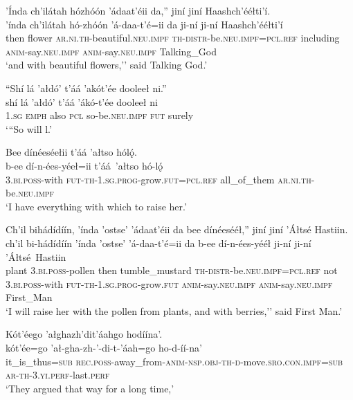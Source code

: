 \ea\label{ex:text5-6-20}
’Índa ch’ilátah hózhóón ’ádaat’éii da,'' jiní jiní Haashch’ééłti’í.\\
\gll ’índa	ch’ilátah	hó-zhóón	’á-daa-t’é=ii	da	ji-ní	ji-ní	Haashch’ééłti’í\\
     then	flower	\textsc{ar}.\textsc{ni}.\textsc{th}-beautiful.\textsc{neu}.\textsc{impf}	\textsc{th}-\textsc{distr}-be.\textsc{neu}.\textsc{impf}=\textsc{pcl}.\textsc{ref}	including	\textsc{anim}-say.\textsc{neu}.\textsc{impf}	\textsc{anim}-say.\textsc{neu}.\textsc{impf}	Talking\_God\\
\glt `and with beautiful flowers,'' said Talking God.'
\z

\ea\label{ex:text5-6-21}
``Shí lá ’ałdó’ t’áá ’akót’ée dooleeł ni.''\\
\gll shí	lá	’ałdó’	t’áá	’ákó-t’ée	dooleeł	ni\\
     1.\textsc{sg}	\textsc{emph}	also	\textsc{pcl}	so-be.\textsc{neu}.\textsc{impf}	\textsc{fut}	surely\\
\glt `{``}So will l.'
\z

\ea\label{ex:text5-6-22}
Bee dínéeséełii t’áá ’ałtso hólǫ́.\\
\gll b-ee	dí-n-ées-yéeł=ii	t’áá~{’ałtso}	hó-lǫ́\\
     3.\textsc{bi}.\textsc{poss}-with	\textsc{fut}-\textsc{th}-1.\textsc{sg}.\textsc{prog}-grow.\textsc{fut}=\textsc{pcl}.\textsc{ref}	all\_of\_them	\textsc{ar}.\textsc{ni}.\textsc{th}-be.\textsc{neu}.\textsc{impf}\\
\glt `I have everything with which to raise her.'
\z

\ea\label{ex:text5-6-23}
Ch’il bihádídíín, ’índa ’ostse’ ’ádaat’éii da bee dínéesééł,'' jiní jiní ’Áłtsé Hastiin.\\
\gll ch’il	bi-hádídíín	’índa	’ostse’	’á-daa-t’é=ii	da	b-ee	dí-n-ées-yééł	ji-ní	ji-ní	’Áłtsé~{Hastiin}\\
     plant	3.\textsc{bi}.\textsc{poss}-pollen	then	tumble\_mustard	\textsc{th}-\textsc{distr}-be.\textsc{neu}.\textsc{impf}=\textsc{pcl}.\textsc{ref}	not	3.\textsc{bi}.\textsc{poss}-with	\textsc{fut}-\textsc{th}-1.\textsc{sg}.\textsc{prog}-grow.\textsc{fut}	\textsc{anim}-say.\textsc{neu}.\textsc{impf}	\textsc{anim}-say.\textsc{neu}.\textsc{impf}	First\_Man\\
\glt `I will raise her with the pollen from plants, and with berries,'' said First Man.'
\z

\newpage
\ea\label{ex:text5-6-24}
Kót’éego ’ałghazh’dit’áahgo hodíína’.\\
\gll kót’ée=go	’ał-gha-zh-’-di-t-’áah=go	ho-d-íí-na’\\
     it\_is\_thus=\textsc{sub}	\textsc{rec}.\textsc{poss}-away\_from-\textsc{anim}-\textsc{nsp}.\textsc{obj}-\textsc{th}-\textsc{d}-move.\textsc{sro}.\textsc{con}.\textsc{impf}=\textsc{sub}	\textsc{ar}-\textsc{th}-3.\textsc{yi}.\textsc{perf}-last.\textsc{perf}\\
\glt `They argued that way for a long time,'
\z

